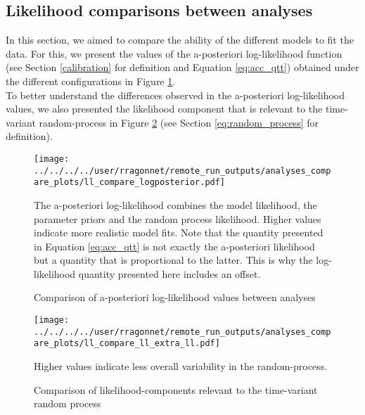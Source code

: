 \subsection{Likelihood comparisons between analyses}

In this section, we aimed to compare the ability of the different models to fit the data. For this, we present the values of the a-posteriori log-likelihood
function (see Section \ref{calibration} for definition and Equation \ref{eq:acc_qtt}) obtained under the different configurations in Figure \ref{fig:compare_likelihood}.\\

To better understand the differences observed in the a-posteriori log-likelihood values, we also presented the likelihood component that is 
relevant to the time-variant random-process in Figure \ref{fig:compare_rp_likelihood} (see Section \ref{eq:random_process} for definition).

\begin{figure}[!ht]
    \begin{center}
    \texttt{[image: ../../../../user/rragonnet/remote\_run\_outputs/analyses\_compare\_plots/ll\_compare\_logposterior.pdf]}
    \end{center}
    \caption{Comparison of a-posteriori log-likelihood values between analyses} 
    The a-posteriori log-likelihood combines the model likelihood, the parameter priors and the random process likelihood. Higher values indicate 
    more realistic model fits. Note that the quantity presented in Equation \ref{eq:acc_qtt} is not exactly the a-posteriori likelihood but a quantity that
    is proportional to the latter. This is why the log-likelihood quantity presented here includes an offset.
    \label{fig:compare_likelihood}
\end{figure}


\begin{figure}[!ht]
    \begin{center}
    \texttt{[image: ../../../../user/rragonnet/remote\_run\_outputs/analyses\_compare\_plots/ll\_compare\_ll\_extra\_ll.pdf]}
    \end{center}
    \caption{Comparison of likelihood-components relevant to the time-variant random process} 
    Higher values indicate less overall variability in the random-process.
    \label{fig:compare_rp_likelihood}
\end{figure}




\clearpage
\newpage
